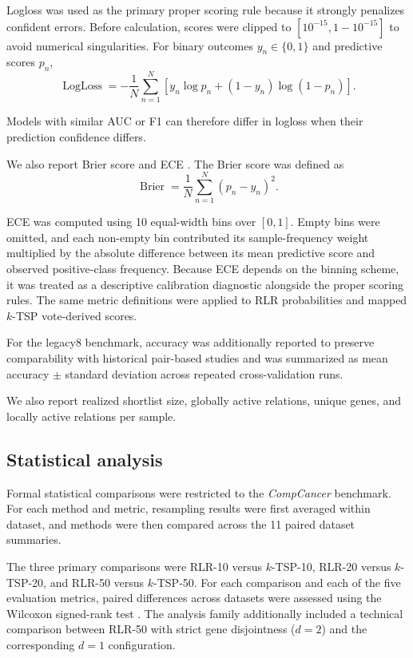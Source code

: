 \documentclass[preprint,12pt,a4paper]{elsarticle}
\begin{document}
Logloss was used as the primary proper scoring rule because it strongly penalizes confident errors. Before calculation, scores were clipped to
$[10^{-15},1-10^{-15}]$ to avoid numerical singularities. For binary outcomes $y_n\in\{0,1\}$ and predictive scores $p_n$,
\[
\operatorname{LogLoss}
=
-\frac{1}{N}\sum_{n=1}^{N}
\left[
y_n\log p_n+
(1-y_n)\log(1-p_n)
\right].
\]

Models with similar AUC or F1 can therefore differ in logloss when their prediction confidence differs.

We also report Brier score and ECE \cite{VanCalster2019}. The Brier score was defined as
\[
\operatorname{Brier}
=
\frac{1}{N}\sum_{n=1}^{N}(p_n-y_n)^2.
\]

ECE was computed using 10 equal-width bins over $[0,1]$. Empty bins were omitted, and each non-empty bin contributed its sample-frequency weight multiplied by the absolute difference between its mean predictive score and observed positive-class frequency. Because ECE depends on the binning scheme, it was treated as a descriptive calibration diagnostic alongside the proper scoring rules. The same metric definitions were applied to RLR probabilities and mapped $k$-TSP vote-derived scores.

For the legacy8 benchmark, accuracy was additionally reported to preserve comparability with historical pair-based studies and was summarized as mean accuracy $\pm$ standard deviation across repeated cross-validation runs.

We also report realized shortlist size, globally active relations, unique genes, and locally active relations per sample.

\subsection{Statistical analysis}

Formal statistical comparisons were restricted to the \emph{CompCancer} benchmark. For each method and metric, resampling results were first averaged within dataset, and methods were then compared across the 11 paired dataset summaries.

The three primary comparisons were RLR-10 versus $k$-TSP-10, RLR-20 versus $k$-TSP-20, and RLR-50 versus $k$-TSP-50. For each comparison and each of the five evaluation metrics, paired differences across datasets were assessed using the Wilcoxon signed-rank test \cite{Wilcoxon1945}. The analysis family additionally included a technical comparison between RLR-50 with strict gene disjointness ($d=2$) and the corresponding $d=1$ configuration.
\end{document}
